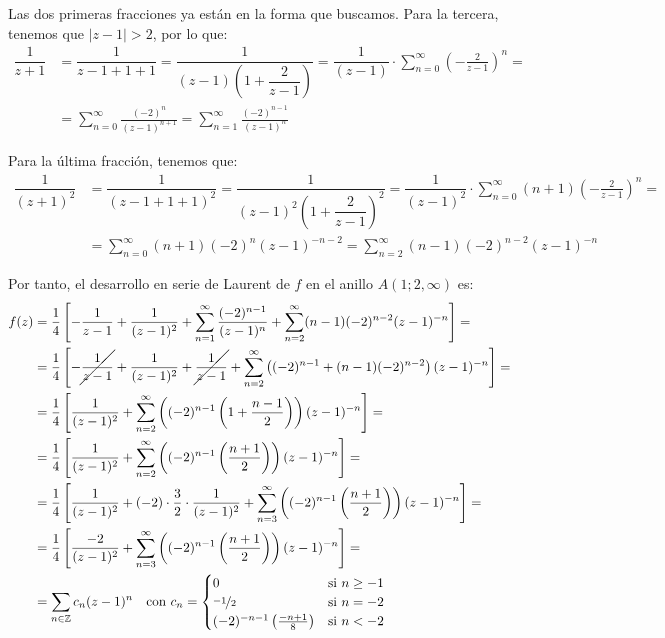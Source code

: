 \begin{ejercicio}
\begin{enumerate}
        Las dos primeras fracciones ya están en la forma que buscamos.
        Para la tercera, tenemos que $|z-1| > 2$, por lo que:
        \begin{align*}
            \dfrac{1}{z+1} &= \dfrac{1}{z-1+1+1}
            = \dfrac{1}{(z-1)\left(1+\dfrac{2}{z-1}\right)}
            = \dfrac{1}{(z-1)} \cdot \sum_{n=0}^{\infty} \left(-\frac{2}{z-1}\right)^n
            =\\&= \sum_{n=0}^{\infty} \frac{(-2)^n}{(z-1)^{n+1}}
            = \sum_{n=1}^{\infty} \frac{(-2)^{n-1}}{(z-1)^n}
        \end{align*}

        Para la última fracción, tenemos que:
        \begin{align*}
            \dfrac{1}{(z+1)^2} &= \dfrac{1}{(z-1+1+1)^2}
            = \dfrac{1}{(z-1)^2\left(1+\dfrac{2}{z-1}\right)^2}
            = \dfrac{1}{(z-1)^2} \cdot \sum_{n=0}^{\infty} (n+1)\left(-\frac{2}{z-1}\right)^n
            =\\&= \sum_{n=0}^{\infty} (n+1)(-2)^n(z-1)^{-n-2}
            = \sum_{n=2}^{\infty} (n-1)(-2)^{n-2}(z-1)^{-n}
        \end{align*}

        Por tanto, el desarrollo en serie de Laurent de $f$ en el anillo $A(1; 2, \infty)$ es:
        \begin{align*}
            f(z) &= \dfrac{1}{4}\left[-\dfrac{1}{z-1} + \dfrac{1}{(z-1)^2} + \sum_{n=1}^{\infty} \frac{(-2)^{n-1}}{(z-1)^n} + \sum_{n=2}^{\infty} (n-1)(-2)^{n-2}(z-1)^{-n}\right]
            =\\&= \dfrac{1}{4}\left[-\cancel{\dfrac{1}{z-1}} + \dfrac{1}{(z-1)^2} + \cancel{\frac{1}{z-1}} + \sum_{n=2}^{\infty} \left((-2)^{n-1} + (n-1)(-2)^{n-2}\right)(z-1)^{-n}\right]
            =\\&= \dfrac{1}{4}\left[\dfrac{1}{(z-1)^2} + \sum_{n=2}^{\infty} \left((-2)^{n-1}\left(1 + \frac{n-1}{2}\right)\right)(z-1)^{-n}\right]
            =\\&= \dfrac{1}{4}\left[\dfrac{1}{(z-1)^2} + \sum_{n=2}^{\infty} \left((-2)^{n-1}\left(\frac{n+1}{2}\right)\right)(z-1)^{-n}\right]
            =\\&= \dfrac{1}{4}\left[\dfrac{1}{(z-1)^2} + (-2)\cdot \frac{3}{2} \cdot \frac{1}{(z-1)^2} + \sum_{n=3}^{\infty} \left((-2)^{n-1}\left(\frac{n+1}{2}\right)\right)(z-1)^{-n}\right]
            =\\&= \dfrac{1}{4}\left[\frac{-2}{(z-1)^2} + \sum_{n=3}^{\infty} \left((-2)^{n-1}\left(\frac{n+1}{2}\right)\right)(z-1)^{-n}\right]
            =\\&= \sum_{n\in \mathbb{Z}} c_n (z-1)^n
            \quad \text{con } c_n = \begin{cases}
                0 & \text{si } n \geq -1\\
                \nicefrac{-1}{2} & \text{si } n = -2\\
                (-2)^{-n-1}\left(\frac{-n+1}{8}\right) & \text{si } n < -2
            \end{cases}
        \end{align*}
        

    \end{enumerate}
\end{ejercicio}

